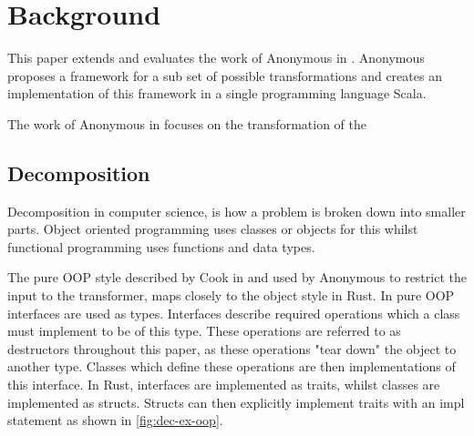 \documentclass[ oneside,%
                    author={James Elgar},
                    degree={MEng},
                     title={Bidirectional transformer between functional and \\ object-oriented programming in Rust},
                  subtitle={}]{dissertation}
\newcommand{\weixin}{Anonymous }
\begin{document}



\chapter{Background}
\label{chap:technical}


This paper extends and evaluates the work of \weixin in \cite{food}. \weixin proposes a framework for a sub set of possible transformations and creates an implementation of this framework in a single programming language Scala. 

The work of \weixin in \cite{food} focuses on the transformation of the

\section{Decomposition}

Decomposition in computer science, is how a problem is broken down into smaller parts. Object oriented programming uses classes or objects for this whilst functional programming uses functions and data types.

The pure OOP style described by Cook in \cite{cook} and used by \weixin to restrict the input to the transformer, maps closely to the object style in Rust. In pure OOP interfaces are used as types. Interfaces describe required operations which a class must implement to be of this type. These operations are referred to as destructors throughout this paper, as these operations "tear down" the object to another type. Classes which define these operations are then implementations of this interface. In Rust, interfaces are implemented as traits, whilst classes are implemented as structs. Structs can then explicitly implement traits with an impl statement as shown in \autoref{fig:dec-ex-oop}. 
\end{document}
